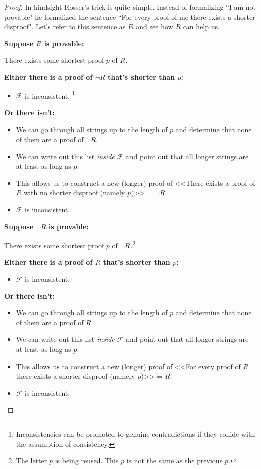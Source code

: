 \documentclass{article}
\newcommand{\nameditem}[1]{\item\textbf{#1}}
\newcommand{\impl}{\item[$\Rightarrow$]}
\newcommand{\F}{\ensuremath{\mathcal{F}}}
\begin{document}
\begin{proof}
In hindsight Rosser's trick is quite simple. Instead of formalizing ``I am not provable" he formalized the sentence ``For every proof of me there exists a shorter disproof". Let's refer to this sentence as $R$ and see how $R$ can help us.
\begin{description}
\nameditem{Suppose $R$ is provable:}
\begin{description}
\impl There exists some shortest proof $p$ of $R$.
\nameditem{Either there is a proof of $\neg R$ that's shorter than $p$:}
\begin{itemize}
\impl $\F$ is inconsistent. \lightning\footnote{Inconsistencies can be promoted to genuine contradictions if they collide with the assumption of consistency.}
\end{itemize}
\nameditem{Or there isn't:}
\begin{itemize}
\impl We can go through all strings up to the length of $p$ and determine that none of them are a proof of $\neg R$.
\impl We can write out this list \textit{inside} $\F$ and point out that all longer strings are at least as long as $p$.
\impl This allows us to construct a new (longer) proof of <<There exists a proof of $R$ with no shorter disproof (namely $p$)>> = $\neg R$.
\impl $\F$ is inconsistent. \lightning
\end{itemize}
\end{description}
\nameditem{Suppose $\neg R$ is provable:}
\begin{description}
\impl There exists some shortest proof $p$ of $\neg R$.\footnote{The letter $p$ is being reused. This $p$ is not the same as the previous $p$.}
\nameditem{Either there is a proof of $R$ that's shorter than $p$:}
\begin{itemize}
\impl $\F$ is inconsistent. \lightning
\end{itemize}
\nameditem{Or there isn't:}
\begin{itemize}
\impl We can go through all strings up to the length of $p$ and determine that none of them are a proof of $R$.
\impl We can write out this list \textit{inside} $\F$ and point out that all longer strings are at least as long as $p$.
\impl This allows us to construct a new (longer) proof of <<For every proof of $R$ there exists a shorter disproof (namely $p$)>> = $R$.
\impl $\F$ is inconsistent. \lightning
\end{itemize}
\end{description}
\end{description}
\end{proof}
\end{document}
